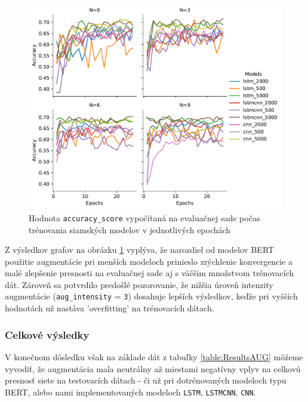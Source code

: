\documentclass[a4paper, 16pt]{article}
\begin{document}
\begin{figure}[H]
    \centering
    \includegraphics[width=15cm]{NN_graph.pdf}
    \caption{Hodnota \texttt{accuracy\_score} vypočítaná na evaluačnej sade počas trénovania siamských modelov v jednotlivých epochách}
    \label{fig:2}
\end{figure}

Z výsledkov grafov na obrázku \ref{fig:2} vyplýva, že narozdiel od modelov BERT použitie augmentácie pri menších modeloch prinieslo zrýchlenie konvergencie a malé zlepšenie presnosti na evaluačnej sade aj s väčšim množstvom trénovacích dát. Zároveň sa potvrdilo predošlé pozorovanie, že nižšia úroveň intenzity augmentácie (\texttt{aug\_intensity} = \texttt{3}) dosahuje lepších výsledkov, keďže pri vyšších hodnotách už nastáva 'overfitting' na trénovacích dátach.

\subsubsection{Celkové výsledky}

V konečnom dôsledku však na základe dát z tabuľky \ref{table:ResultsAUG} môžeme vyvodiť, že augmentácia mala neutrálny až miestami negatívny vplyv na celkovú presnosť siete na testovacích dátach - či už pri dotrénovaných modeloch typu BERT, alebo nami implementovaných modeloch \texttt{LSTM}, \texttt{LSTMCNN}, \texttt{CNN}.
\end{document}
